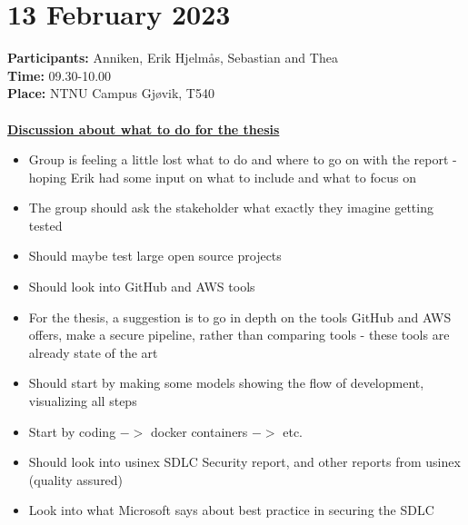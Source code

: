\label{møteErik}
\section{13 February 2023}
\textbf{Participants:} Anniken, Erik Hjelmås, Sebastian and Thea \\
\textbf{Time:} 09.30-10.00 \\
\textbf{Place:} NTNU Campus Gjøvik, T540
\\~\\

\textbf{\underline{Discussion about what to do for the thesis}}
\begin{itemize}
    \item Group is feeling a little lost what to do and where to go on with the report - hoping Erik had some input on what to include and what to focus on
    \item The group should ask the stakeholder what exactly they imagine getting tested 
    \item Should maybe test large open source projects 
    \item Should look into GitHub and AWS tools 
    \item For the thesis, a suggestion is to go in depth on the tools GitHub and AWS offers, make a secure pipeline, rather than comparing tools - these tools are already state of the art 
    \item Should start by making some models showing the flow of development, visualizing all steps 
    \item Start by coding $->$ docker containers $->$ etc. 
    \item Should look into usinex SDLC Security report, and other reports from usinex (quality assured) 
    \item Look into what Microsoft says about best practice in securing the SDLC 
\end{itemize}